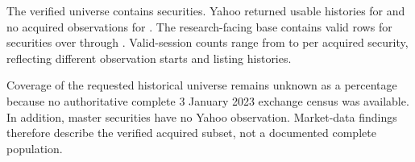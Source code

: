 
The verified universe contains \IncludedSecurities{} securities. Yahoo returned usable histories for \YahooSuccess{} and no acquired observations for \YahooFailed{}. The research-facing base contains \Observations{} valid rows for \ObservedSecurities{} securities over \PriceStart{} through \PriceEnd{}. Valid-session counts range from \MinSessionsPerSecurity{} to \SessionsPerSecurity{} per acquired security, reflecting different observation starts and listing histories.

Coverage of the requested historical universe remains unknown as a percentage because no authoritative complete 3 January 2023 exchange census was available. In addition, \UniverseWithoutObservations{} master securities have no Yahoo observation. Market-data findings therefore describe the verified acquired subset, not a documented complete population.
